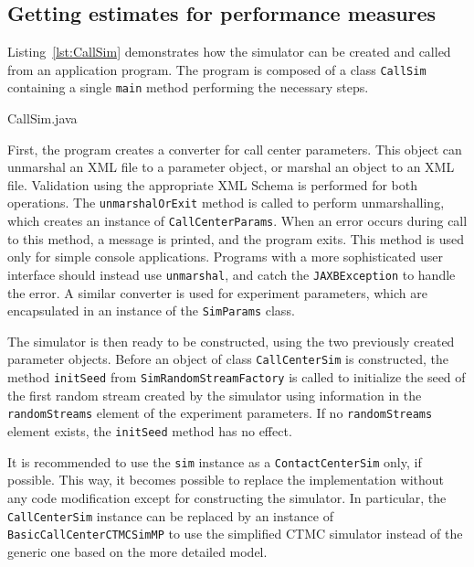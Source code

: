 \subsection{Getting estimates for performance measures}

Listing~\ref{lst:CallSim} demonstrates how the simulator can be
created and called from an application program.
The program is composed of a class \texttt{Call\-Sim} containing a
single \texttt{main} method performing the necessary steps.


{CallSim.java}

First, the program creates a converter for call center parameters.
This object can unmarshal an XML file to a parameter object, or
marshal an object to an XML file.
Validation using the appropriate XML Schema is performed for both
operations.
The \texttt{unmarshal\-Or\-Exit} method is called to
perform unmarshalling, which creates an instance of
\texttt{Call\-Center\-Params}.
When an error occurs during call to this method, a message
is printed, and the program exits.
This method is used only for simple console applications.
Programs with a more sophisticated user interface
should instead use \texttt{unmarshal}, and
catch the \texttt{JAXBException} to handle the error.
A similar converter is used for experiment parameters, which are
encapsulated in an instance of the \texttt{Sim\-Params} class.

The simulator is then ready to be constructed, using the two
previously created parameter
objects. Before an object of class \texttt{Call\-Center\-Sim} is constructed,
the method \texttt{init\-Seed} from
\texttt{Sim\-Random\-Stream\-Factory} is called to initialize the seed
of the first random stream created by the simulator using information
in the \texttt{random\-Streams} element of the experiment parameters.
If no \texttt{random\-Streams} element exists, the
\texttt{init\-Seed} method has no effect.

It is recommended to use
the \texttt{sim} instance as a \texttt{Contact\-Center\-Sim} only, if
possible.  This
way, it becomes possible to replace the implementation
without any code modification except for constructing the simulator.
In particular, the \texttt{Call\-Center\-Sim} instance can be replaced
by an instance of
\texttt{Basic\-Call\-Center\-CTMC\-Sim\-MP} to use the simplified CTMC
simulator instead of the generic one based on the more detailed model.

